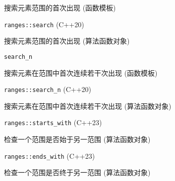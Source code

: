 搜索元素范围的⾸次出现 (函数模板)

\noindent \lstinline{ranges::search} (C++20)

搜索元素范围的⾸次出现 (算法函数对象)

\noindent \lstinline{search_n}

搜索元素在范围中⾸次连续若⼲次出现 (函数模板)

\noindent \lstinline{ranges::search_n} (C++20) 

搜索元素在范围中⾸次连续若⼲次出现 (算法函数对象)

\noindent \lstinline{ranges::starts_with} (C++23)

检查⼀个范围是否始于另⼀范围 (算法函数对象)

\noindent \lstinline{ranges::ends_with} (C++23)

检查⼀个范围是否终于另⼀范围 (算法函数对象)